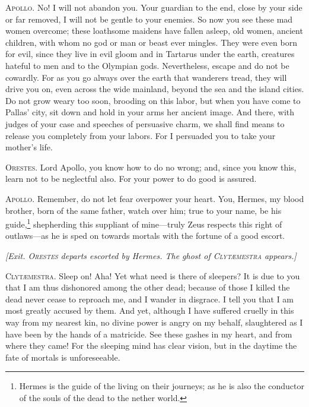 \documentclass[12pt]{article}
\begin{document}
\textsc{Apollo.} No! I will not abandon you. Your guardian to the end, close by your side or far removed, I will not be gentle to your enemies. So now you see these mad women overcome; these loathsome maidens have fallen asleep, old women, ancient children, with whom no god or man or beast ever mingles. They were even born for evil, since they live in evil gloom and in Tartarus under the earth, creatures hateful to men and to the Olympian gods. Nevertheless, escape and do not be cowardly. For as you go always over the earth that wanderers tread, they will drive you on, even across the wide mainland, beyond the sea and the island cities. Do not grow weary too soon, brooding on this labor, but when you have come to Pallas' city, sit down and hold in your arms her ancient image. And there, with judges of your case and speeches of persuasive charm, we shall find means to release you completely from your labors. For I persuaded you to take your mother's life.

\textsc{Orestes.} Lord Apollo, you know how to do no wrong; and, since you know this, learn not to be neglectful also. For your power to do good is assured.

\textsc{Apollo.} Remember, do not let fear overpower your heart. You, Hermes, my blood brother, born of the same father, watch over him; true to your name, be his guide,\footnote{Hermes is the guide of the living on their journeys; as he is also the conductor of the souls of the dead to the nether world.} shepherding this suppliant of mine---truly Zeus respects this right of outlaws---as he is sped on towards mortals with the fortune of a good escort.

\begin{center}
\textit{[Exit. \textsc{Orestes} departs escorted by Hermes. The ghost of \textsc{Clyt{\ae}mestra} appears.]}
\end{center}

\textsc{Clyt{\ae}mestra.} Sleep on! Aha! Yet what need is there of sleepers? It is due to you that I am thus dishonored among the other dead; because of those I killed the dead never cease to reproach me, and I wander in disgrace. I tell you that I am most greatly accused by them. And yet, although I have suffered cruelly in this way from my nearest kin, no divine power is angry on my behalf, slaughtered as I have been by the hands of a matricide. See these gashes in my heart, and from where they came! For the sleeping mind has clear vision, but in the daytime the fate of mortals is unforeseeable.
\end{document}

